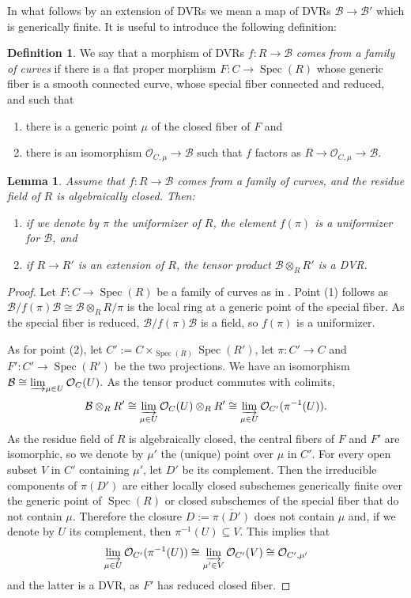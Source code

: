 \documentclass{amsart}
\newcommand{\cB}{\mathcal{B}}
\newcommand{\cO}{\mathcal{O}}
\newcommand{\qB}{R}
\newcommand{\qR}{\cB}
\newcommand{\spec}{\operatorname{Spec}}
\newtheorem{Lemma}[theorem]{Lemma}
\theoremstyle{definition}
\newtheorem{Def}[theorem]{Definition}
\begin{document}
In what follows by an extension of DVRs we mean a map of DVRs $\qR\to \qR'$ which is generically finite. 
It is useful to introduce the following definition:
\begin{Def}\label{def comes from family of curves}
 We say that a morphism of DVRs $f:\qB\to \qR$ \textit{comes from a family of curves} if there is a flat proper morphism $F:C\to \spec(\qB)$ whose generic fiber is a smooth connected curve, whose special fiber connected and reduced, and such that
 \begin{enumerate}
     \item there is a generic point $\mu$ of the closed fiber of $F$ and
     \item there is an isomorphism $\cO_{C,\mu}\to \qR$ such that $f$ factors as $\qB\to \cO_{C,\mu}\to \qR$.
 \end{enumerate} 
\end{Def}
\begin{Lemma}\label{lemma tensor product thing is a DVR}
Assume that $f:\qB\to \qR$ comes from a family of curves, and the residue field of $\qB$ is algebraically closed. Then:
\begin{enumerate}
    \item if we denote by $\pi$ the uniformizer of $\qB$, the element $f(\pi)$ is a uniformizer for $\qR$, and
    \item if $\qB\to \qB'$ is an extension of $\qB$, the tensor product $\qR\otimes_\qB \qB'$ is a DVR.
\end{enumerate}
\end{Lemma}
\begin{proof} Let $F:C\to \spec(\qB)$ be a family of curves as in . 
Point (1) follows as $\qR/f(\pi)\qR\cong \qR\otimes_\qB \qB/\pi$ is the local ring at a generic point of the special fiber. As the special fiber is reduced, $\qR/f(\pi)\qR$ is a field, so $f(\pi)$ is a uniformizer.

As for point (2), let $C':= C\times_{\spec(\qB)}\spec(\qB')$, let $\pi:C'\to C$ and $F':C'\to \spec(\qB')$ be the two projections. We have an isomorphism $\qR\cong \varinjlim_{\mu \in U} \cO_{C}(U).$
As the tensor product commutes with colimits, $$\qR\otimes_\qB \qB' \cong \varinjlim_{\mu \in U} \cO_{C}(U)\otimes_\qB \qB' \cong \varinjlim_{\mu \in U} \cO_{C'}(\pi^{-1}(U)).$$
As the residue field of $\qB$ is algebraically closed, the central fibers of $F$ and $F'$ are isomorphic, so we denote by $\mu'$ the (unique) point over $\mu$ in $C'$. For every open subset $V$ in $C'$ containing $\mu'$, let $D'$ be its complement. Then the irreducible components of $\pi(D')$ are either
locally closed subschemes generically finite over the generic point of $\spec(\qB)$ or closed subschemes of the special fiber that do not contain $\mu$. Therefore the closure $D:= \overline{\pi(D')}$ does not contain $\mu$ and, if we denote by $U$ its complement, then $\pi^{-1}(U)\subseteq V$. This implies that 
$$\varinjlim_{\mu \in U} \cO_{C'}(\pi^{-1}(U)) \cong \varinjlim_{\mu '  \in V} \cO_{C'}(V) \cong \cO_{C',\mu'}$$
and the latter is a DVR, as $F'$ has reduced closed fiber. 
\end{proof}
\end{document}
